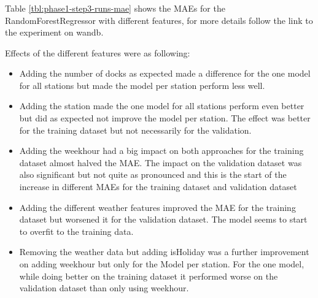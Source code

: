 \documentclass[a4paper]{article}
\begin{document}
    \subsubsection*{}

    Table \ref{tbl:phase1-step3-runs-mae} shows the MAEs for the RandomForestRegressor with different features, for more
    details follow the link to the experiment on wandb.

    Effects of the different features were as following:
    \begin{itemize}
        \item  Adding the number of docks as expected made a difference for
        the one model for all stations but made the model per station perform less well.
        \item Adding the station made the one model for all stations perform even better but did as expected not improve
        the model per station. The effect was better for the training dataset but not necessarily for the validation.
        \item Adding the weekhour had a big impact on both approaches for the training dataset almost halved the MAE.
        The impact on the validation dataset was also significant but not quite as pronounced and this is the start of the
        increase in different MAEs for the training dataset and validation dataset
        \item Adding the different weather features improved the MAE for the training dataset but worsened it for the validation
        dataset. The model seems to start to overfit to the training data.
        \item Removing the weather data but adding isHoliday was a further improvement on adding weekhour but only for the Model
        per station. For the one model, while doing better on the training dataset it performed worse on the validation dataset
        than only using weekhour.
    \end{itemize}
\end{document}
